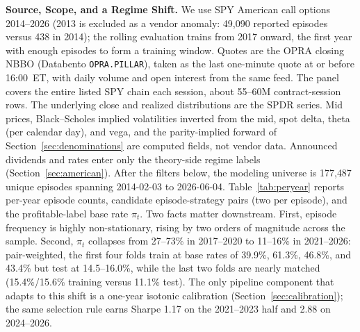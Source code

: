 \documentclass[sigconf,review]{acmart}
\begin{document}
\medskip\noindent\textbf{Source, Scope, and a Regime Shift.}
\label{sec:data-source}
We use SPY American call options 2014--2026 (2013 is excluded as a vendor anomaly: 49{,}090 reported episodes versus 438 in 2014); the rolling evaluation trains from 2017 onward, the first year with enough episodes to form a training window. Quotes are the OPRA closing NBBO (Databento \texttt{OPRA.PILLAR}), taken as the last one-minute quote at or before 16:00~ET, with daily volume and open interest from the same feed. The panel covers the entire listed SPY chain each session, about 55--60M contract-session rows. The underlying close and realized distributions are the SPDR series. Mid prices, Black--Scholes implied volatilities inverted from the mid, spot delta, theta (per calendar day), and vega, and the parity-implied forward of Section~\ref{sec:denominations} are computed fields, not vendor data. Announced dividends and rates enter only the theory-side regime labels (Section~\ref{sec:american}). After the filters below, the modeling universe is 177{,}487 unique episodes spanning 2014-02-03 to 2026-06-04. Table~\ref{tab:peryear} reports per-year episode counts, candidate episode-strategy pairs (two per episode), and the profitable-label base rate $\pi_t$. Two facts matter downstream. First, episode frequency is highly non-stationary, rising by two orders of magnitude across the sample. Second, $\pi_t$ collapses from 27--73\% in 2017--2020 to 11--16\% in 2021--2026: pair-weighted, the first four folds train at base rates of 39.9\%, 61.3\%, 46.8\%, and 43.4\% but test at 14.5--16.0\%, while the last two folds are nearly matched (15.4\%/15.6\% training versus 11.1\% test). The only pipeline component that adapts to this shift is a one-year isotonic calibration (Section~\ref{sec:calibration}); the same selection rule earns Sharpe 1.17 on the 2021--2023 half and 2.88 on 2024--2026.
\end{document}
